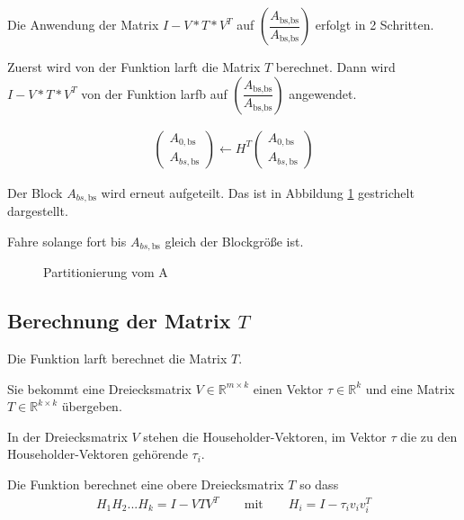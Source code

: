 Die Anwendung der Matrix $I - V*T*V^T$ auf $\left(\dfrac{A_{\text{bs}, \text{bs}}}{A_{\text{bs}, \text{bs}}} \right)$ erfolgt in 2 Schritten.

Zuerst wird von der Funktion \glqq larft \grqq{}  die Matrix $T$ berechnet.
Dann wird $I - V*T*V^T$ von der Funktion \glqq larfb\grqq{} auf $\left(\dfrac{A_{\text{bs}, \text{bs}}}{A_{\text{bs}, \text{bs}}} \right)$ angewendet.


\begin{align}
	\left(\begin{array}{l} 
	A_{0, \text{bs}} \\ \hline
	A_{bs, \text{bs}}
	\end{array}\right)
	\leftarrow
	H^T \left(\begin{array}{l} 
	A_{0, \text{bs}} \\ \hline
	A_{bs, \text{bs}}
	\end{array}\right)
\end{align}


Der Block $A_{bs, \text{bs}}$ wird erneut aufgeteilt. Das ist in Abbildung \ref{fig:blockA} gestrichelt dargestellt.

Fahre solange fort bis $A_{bs, \text{bs}}$ gleich der Blockgröße ist.
\begin{figure}[H]
	\centering
	
	\caption{Partitionierung vom A}
	\label{fig:blockA}
\end{figure}

\subsection{Berechnung der Matrix $T$}
Die Funktion \glqq larft\grqq{} berechnet die Matrix $T$. 

Sie bekommt eine Dreiecksmatrix $V \in \mathbb{R}^{m \times k}$ einen Vektor $\tau \in \mathbb{R}^k$ und eine Matrix $T\in \mathbb{R}^{k\times k}$ übergeben. 

In der Dreiecksmatrix $V$ stehen die Householder-Vektoren,
im Vektor $\tau$ die zu den Householder-Vektoren gehörende $\tau_i$.

Die Funktion berechnet eine obere Dreiecksmatrix $T$ so dass
\begin{align*}
	H_1H_2...H_k = I - VTV^T \qquad \text{mit}\qquad H_i = I - \tau_i v_iv_i^T
\end{align*}

